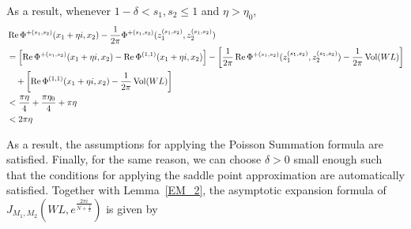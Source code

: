 \documentclass[10pt,a4paper]{article}
\newcommand{\lt}{\left}
\newcommand{\rt}{\right}
\def\Vol{\operatorname{Vol}}
\def \Re{\operatorname{Re}}
\def\Vol{\operatorname{Vol}}
\def \Re{\operatorname{Re}}
\begin{document}
As a result, whenever $1-\delta<s_1,s_2 \leq 1$ and $\eta > \eta_0$,
\begin{align}\label{S1'}
&\Re\Phi^{+(s_1,s_2)}(x_1 + \eta i, x_2) - \frac{1}{2\pi}\Phi^{+(s_1,s_2)}(z^{(s_1,s_2)}_1, z^{(s_1,s_2)}_2) \notag\\
&= \lt[\Re\Phi^{+(s_1,s_2)}(x_1 + \eta i, x_2) - \Re\Phi^{(1,1)}(x_1+ \eta i,x_2)\rt] - \lt[\frac{1}{2\pi}\Re\Phi^{+(s_1,s_2)}(z^{(s_1,s_2)}_1, z^{(s_1,s_2)}_2) - \frac{1}{2\pi}\Vol(WL)\rt] \notag\\
& \quad + \lt[ \Re\Phi^{(1,1)}(x_1+ \eta i,x_2) - \frac{1}{2\pi}\Vol(WL)\rt]\notag \\
&< \frac{\pi \eta}{4} + \frac{\pi \eta_0}{4} + \pi \eta \notag \\
&< 2\pi \eta
\end{align}
\fi

As a result, the assumptions for applying the Poisson Summation formula are satisfied. Finally, for the same reason, we can choose $\delta>0$ small enough such that the conditions for applying the saddle point approximation are automatically satisfied. Together with Lemma~\ref{EM_2}, the asymptotic expansion formula of $J_{M_1,M_2}(WL,e^{\frac{2\pi i}{N+\frac{1}{2}}})$ is given by
\end{document}
